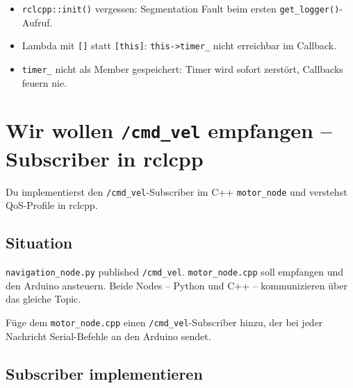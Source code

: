 \begin{fehlerBox}
\begin{itemize}
\item \texttt{rclcpp::init()} vergessen: Segmentation Fault beim ersten
  \texttt{get\_logger()}-Aufruf.
\item Lambda mit \texttt{[]} statt \texttt{[this]}:
  \texttt{this->timer\_} nicht erreichbar im Callback.
\item \texttt{timer\_} nicht als Member gespeichert:
  Timer wird sofort zerstört, Callbacks feuern nie.
\end{itemize}
\end{fehlerBox}


\chapter{Wir wollen \texttt{/cmd\_vel} empfangen –
  Subscriber in rclcpp}

\begin{lernziele}
Du implementierst den \texttt{/cmd\_vel}-Subscriber im C++ \texttt{motor\_node}
und verstehst QoS-Profile in rclcpp.
\end{lernziele}

\section{Situation}

\texttt{navigation\_node.py} published \texttt{/cmd\_vel}.
\texttt{motor\_node.cpp} soll empfangen und den Arduino ansteuern.
Beide Nodes -- Python und C++ -- kommunizieren über das gleiche Topic.

\begin{aufgabeBox}
Füge dem \texttt{motor\_node.cpp} einen \texttt{/cmd\_vel}-Subscriber hinzu,
der bei jeder Nachricht Serial-Befehle an den Arduino sendet.
\end{aufgabeBox}

\section{Subscriber implementieren}

